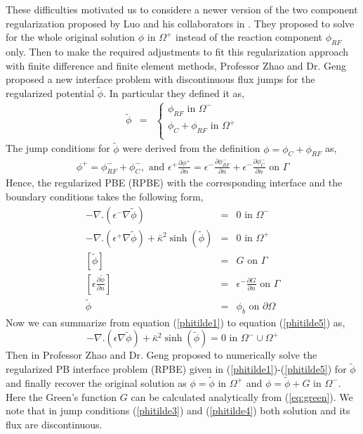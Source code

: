 These difficulties motivated us to considere a newer version of the two component regularization proposed by Luo and his collaborators in \cite{Cai2009}. They proposed to solve for the whole original solution $\phi$ in $\Omega^+$ instead of the reaction component $\phi_{RF}$ only. Then to make the required adjustments to fit this regularization approach with finite difference and finite element methods, Professor Zhao and Dr. Geng  proposed a new interface problem \cite{Geng2017a} with discontinuous flux jumps for the regularized potential $\tilde \phi$. In particular they defined it as,  
\begin{eqnarray}
	\tilde{ \phi} &=& \begin{cases}
	\phi_{RF} \text{ in } \Omega^-\\
	\phi_C + \phi_{RF} \text{ in } \Omega^+\\
	\end{cases}
\end{eqnarray}
 The jump conditions for $\tilde\phi $ were derived from the definition $\phi=\phi_C+\phi_{RF}$ as,
\begin{eqnarray}
\phi^+=\phi^-_{RF}+\phi^-_C,\text{  and  } \epsilon^+ \frac{\partial \phi^+}{\partial n}=\epsilon^- \frac{\partial \phi^-_{RF}}{\partial n}+\epsilon^- \frac{\partial \phi^-_C}{\partial n} \text{ on } \Gamma
\end{eqnarray}
Hence, the regularized PBE (RPBE) with the corresponding interface and the boundary conditions takes the following form, 
\begin{eqnarray}
	-\nabla.(\epsilon^- \nabla \tilde{ \phi}) &=& 0 \text{ in } \Omega^-\label{phitilde1}\\ 
	-\nabla.(\epsilon^+ \nabla \tilde{ \phi}) +\bar\kappa^2 \sinh(\tilde{ \phi})&=& 0 \text{ in } \Omega^+\label{phitilde2}\\
	\left[\tilde{ \phi}\right] &=& G \text{ on } \Gamma \label{phitilde3}\\ 
	\left[\epsilon\frac{\partial \tilde{ \phi}}{\partial n}\right]&=& \epsilon^-  \frac{\partial G}{\partial n} \text{ on } \Gamma\label{phitilde4}\\
	\tilde{\phi} &=& \phi_b \text{ on } \partial \Omega \label{phitilde5}
\end{eqnarray}	
Now we can summarize from equation (\ref{phitilde1}) to equation (\ref{phitilde5}) as, 
\begin{equation}
	-\nabla . (\epsilon \nabla \tilde{ \phi}) +\bar\kappa^2 \sinh(\tilde{ \phi})=0 \text{ in } \Omega^-\cup\Omega^+\label{eq:RPBE}
\end{equation}
Then in \cite{Geng2017a} Professor Zhao and Dr. Geng proposed to numerically solve the regularized PB interface problem (RPBE) given in (\ref{phitilde1})-(\ref{phitilde5}) for $\tilde \phi$ and finally recover the original solution as $\phi= \tilde\phi $ in $\Omega^+$ and $\phi = \tilde \phi + G $ in $\Omega^-$. Here the Green's function $G$ can be calculated analytically from  (\ref{eq:green}). We note that in  jump conditions (\ref{phitilde3}) and (\ref{phitilde4}) both solution and its flux are discontinuous. 
